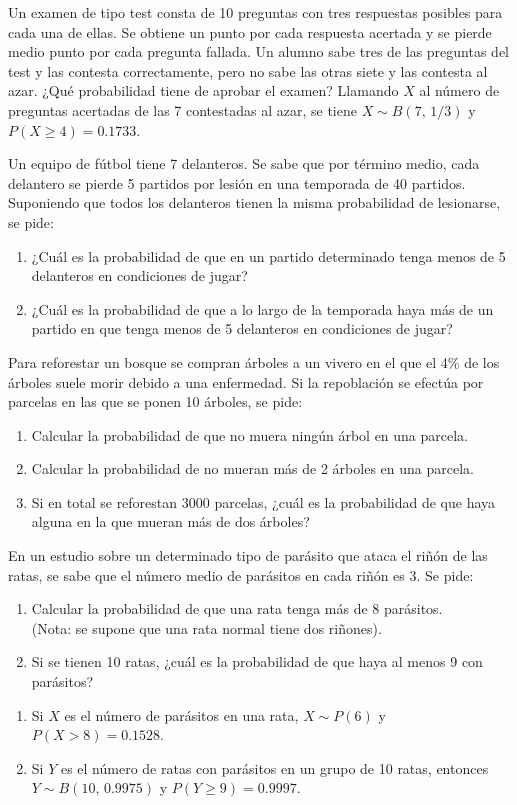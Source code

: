 {Un examen de tipo test consta de 10 preguntas con tres respuestas posibles para cada una de ellas.
Se obtiene un punto por cada respuesta acertada y se pierde medio punto por cada pregunta fallada.
Un alumno sabe tres de las preguntas del test y las contesta correctamente, pero no sabe las otras siete y las contesta
al azar.
¿Qué probabilidad tiene de aprobar el examen?}
{Llamando $X$ al número de preguntas acertadas de las 7 contestadas al azar, se tiene $X\sim B(7,\,1/3)$ y $P(X\geq
4)=0.1733$.}
{}


{Un equipo de fútbol tiene 7 delanteros. Se sabe que por término medio, cada delantero se pierde 5 partidos por lesión en una temporada de 40 partidos. Suponiendo que todos los delanteros tienen la misma probabilidad de lesionarse, se pide:
\begin{enumerate}
\item  ¿Cuál es la probabilidad de que en un partido determinado tenga menos de 5 delanteros en condiciones de jugar?
\item  ¿Cuál es la probabilidad de que a lo largo de la temporada haya más de un partido en que tenga menos de 5  delanteros en condiciones de jugar?
\end{enumerate}
}
{}
{}


{Para reforestar un bosque se compran árboles a un vivero en el que el 4\% de los árboles suele morir debido a una enfermedad. Si la repoblación se efectúa por parcelas en las que se ponen 10 árboles, se pide:
\begin{enumerate}
\item Calcular la probabilidad de que no muera ningún árbol en una parcela.
\item Calcular la probabilidad de no mueran más de 2 árboles en una parcela.
\item Si en total se reforestan 3000 parcelas, ¿cuál es la probabilidad de que haya alguna en la que mueran más de dos árboles?
\end{enumerate}
}
{}
{}


{En un estudio sobre un determinado tipo de parásito que ataca el riñón de las ratas, se sabe que el número medio de
parásitos en cada riñón es 3.
Se pide:
\begin{enumerate}
\item  Calcular la probabilidad de que una rata tenga más de 8 parásitos.\\
(Nota: se supone que una rata normal tiene dos riñones).
\item  Si se tienen 10 ratas, ¿cuál es la probabilidad de que haya al menos 9 con parásitos?
\end{enumerate}
}
{
\begin{enumerate}
\item Si $X$ es el número de parásitos en una rata, $X\sim P(6)$ y $P(X>8)=0.1528$.
\item Si $Y$ es el número de ratas con parásitos en un grupo de 10 ratas, entonces $Y\sim B(10,\,0.9975)$ y $P(Y\geq
9)=0.9997$.
\end{enumerate}
}
{}


